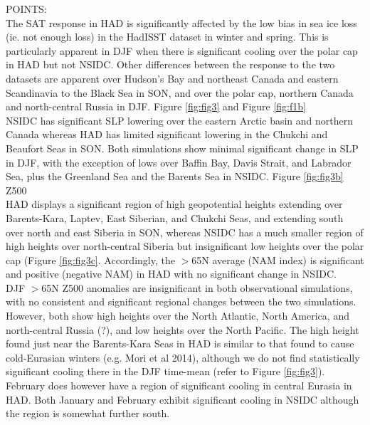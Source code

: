 \documentclass[twocol]{ametsoc}
\begin{document}
POINTS:\\
The SAT response in HAD is significantly affected by the low bias in sea ice loss (ie. not enough loss) in the HadISST dataset in winter and spring. This is particularly apparent in DJF when there is significant cooling over the polar cap in HAD but not NSIDC. Other differences between the response to the two datasets are apparent over Hudson's Bay and northeast Canada and eastern Scandinavia to the Black Sea in SON, and over the polar cap, northern Canada and north-central Russia in DJF. Figure \ref{fig:fig3} and Figure \ref{fig:f1b}\\

NSIDC has significant SLP lowering over the eastern Arctic basin and northern Canada whereas HAD has limited significant lowering in the Chukchi and Beaufort Seas in SON. Both simulations show minimal significant change in SLP in DJF, with the exception of lows over Baffin Bay, Davis Strait, and Labrador Sea, plus the Greenland Sea and the Barents Sea in NSIDC. Figure \ref{fig:fig3b}\\

Z500 \\
HAD displays a significant region of high geopotential heights extending over Barents-Kara, Laptev, East Siberian, and Chukchi Seas, and extending south over north and east Siberia in SON, whereas NSIDC has a much smaller region of high heights over north-central Siberia but insignificant low heights over the polar cap (Figure \ref{fig:fig3c}. Accordingly, the $>$65N average (NAM index) is significant and positive (negative NAM) in HAD with no significant change in NSIDC. \\
DJF $>$65N Z500 anomalies are insignificant in both observational simulations, with no consistent and significant regional changes between the two simulations. However, both show high heights over the North Atlantic, North America, and north-central Russia (?), and low heights over the North Pacific. The high height found just near the Barents-Kara Seas in HAD is similar to that found to cause cold-Eurasian winters (e.g. Mori et al 2014), although we do not find statistically significant cooling there in the DJF time-mean (refer to Figure \ref{fig:fig3}). February does however have a region of significant cooling in central Eurasia in HAD. Both January and February exhibit significant cooling in NSIDC although the region is somewhat further south.\\
\end{document}
